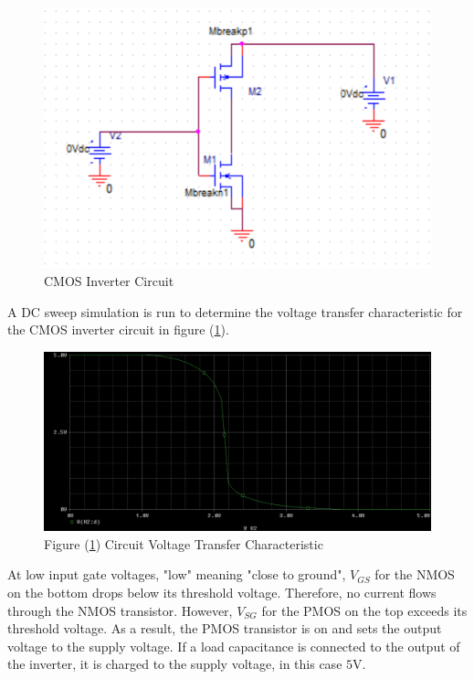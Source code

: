 \FloatBarrier

\begin{figure}[h!]
	\centering
	\includegraphics[scale=0.75]{./images/circuit1.PNG}
	\caption{CMOS Inverter Circuit}
	\label{fig:circuit1}
\end{figure}

\FloatBarrier

A DC sweep simulation is run to determine the voltage transfer characteristic for the CMOS inverter circuit in figure (\ref{fig:circuit1}).

\FloatBarrier

\begin{figure}[h!]
	\centering
	\includegraphics[scale=0.50]{./images/circuit1_dcsweep.PNG}
	\caption{Figure (\ref{fig:circuit1}) Circuit Voltage Transfer Characteristic}
	\label{fig:circuit1_dcsweep}
\end{figure}

\FloatBarrier

At low input gate voltages, "low" meaning "close to ground", $V_{GS}$ for the NMOS on the bottom drops below its threshold voltage. Therefore, no current flows through the NMOS transistor. However, $V_{SG}$ for the PMOS on the top exceeds its threshold voltage. As a result, the PMOS transistor is on and sets the output voltage to the supply voltage. If a load capacitance is connected to the output of the inverter, it is charged to the supply voltage, in this case $5$\si{\volt}. \\

